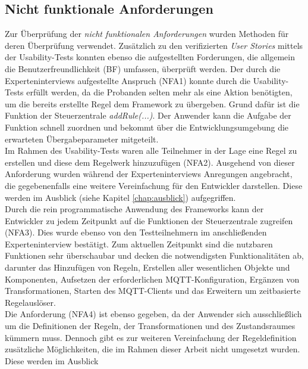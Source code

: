     \subsection*{Nicht funktionale Anforderungen}
        Zur Überprüfung der \textit{nicht funktionalen Anforderungen} wurden Methoden für deren Überprüfung verwendet. Zusätzlich zu den 
        verifizierten \textit{User Stories} mittels der Usability-Tests konnten ebenso die aufgestellten Forderungen, die allgemein 
        die Benutzerfreundlichkeit (BF) umfassen, überprüft werden. Der durch die Experteninterviews aufgestellte Anspruch (NFA1) konnte 
        durch die Usability-Tests erfüllt werden, da die Probanden selten mehr als eine Aktion benötigten, um die bereits erstellte Regel 
        dem Framework zu übergeben. Grund dafür ist die Funktion der Steuerzentrale \textit{addRule(...)}. Der Anwender kann die Aufgabe der Funktion 
        schnell zuordnen und bekommt über die Entwicklungsumgebung die erwarteten Übergabeparameter mitgeteilt. 
        \\
        \linebreak 
        Im Rahmen des Usability-Tests waren alle Teilnehmer in der Lage eine Regel zu erstellen 
        und diese dem Regelwerk hinzuzufügen (NFA2). Ausgehend von dieser Anforderung wurden 
        während der Experteninterviews Anregungen angebracht, die gegebenenfalls eine weitere Vereinfachung für den Entwickler darstellen. 
        Diese werden im Ausblick (siehe Kapitel \ref{chap:ausblick}) aufgegriffen. 
        \\
        Durch die rein programmatische Anwendung des Frameworks kann der Entwickler zu jedem Zeitpunkt auf die Funktionen der Steuerzentrale zugreifen (NFA3). 
        Dies wurde ebenso von den Testteilnehmern im anschließenden Experteninterview bestätigt. Zum aktuellen Zeitpunkt sind die nutzbaren Funktionen sehr 
        überschaubar und decken die notwendigsten Funktionalitäten ab, darunter das Hinzufügen von Regeln, 
        Erstellen aller wesentlichen Objekte und Komponenten, Aufsetzen der erforderlichen \acs{MQTT}-Konfiguration, Ergänzen von Transformationen, Starten 
        des \acs{MQTT}-Clients und das Erweitern um zeitbasierte Regelauslöser. 
        \\
        \linebreak 
        Die Anforderung (NFA4) ist ebenso gegeben, da der Anwender sich 
        ausschließlich um die Definitionen der Regeln, der Transformationen und des Zustandsraumes kümmern muss. Dennoch gibt es zur weiteren 
        Vereinfachung der Regeldefinition zusätzliche Möglichkeiten, die im Rahmen dieser Arbeit nicht umgesetzt wurden. Diese werden im Ausblick 
